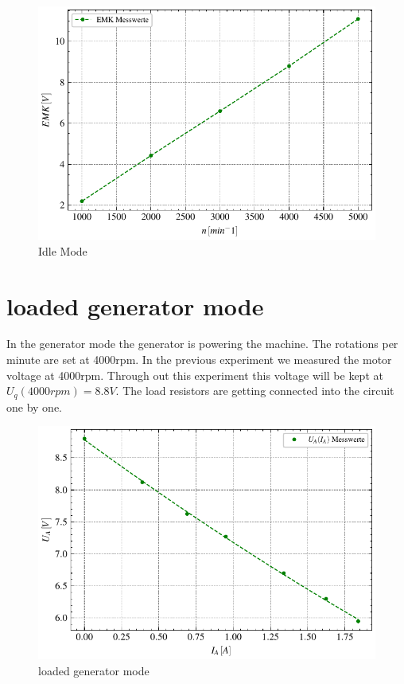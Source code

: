 \documentclass[conference]{IEEEtran}
\begin{document}
\begin{figure}[htbp]
    \centering
    \includegraphics[width=\columnwidth]{plots/4.1_Leerlaufversuch.pdf}
    \caption{Idle Mode}
    \label{fig:Anlaufmoment}
\end{figure}


\section{loaded generator mode}
In the generator mode the generator is powering the machine. The rotations per minute are set at 4000rpm.
In the previous experiment we measured the motor voltage at 4000rpm. Through out this experiment this voltage will be kept at $U_q(4000rpm) = 8.8V$.
The load resistors are getting connected into the circuit one by one.


\begin{figure}[htbp]
    \centering
    \includegraphics[width=\columnwidth]{plots/4.2_Belasteter_Generator_4000.pdf}
    \caption{loaded generator mode}
    \label{fig:Anlaufmoment}
\end{figure}
\end{document}
